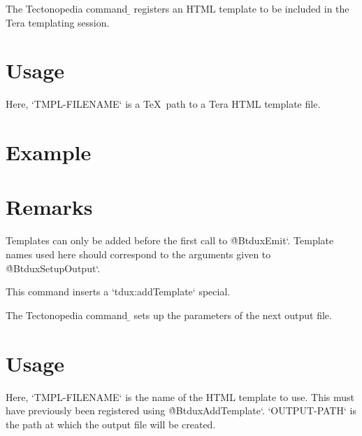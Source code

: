 
The Tectonopedia command \b{\string\tduxAddTemplate} registers an HTML template
to be included in the Tera templating session.

\section*{Usage}

\begin{texdisp}
\end{texdisp}

Here, \tex`TMPL-FILENAME` is a \TeX\ path to a Tera HTML template file.

\section*{Example}

\begin{texdisp}
\end{texdisp}

\section*{Remarks}

Templates can only be added before the first call to \`@BtduxEmit`. Template
names used here should correspond to the arguments given to
\`@BtduxSetupOutput`.

This command inserts a \tex`tdux:addTemplate` special.



The Tectonopedia command \b{\string\tduxSetupOutput} sets up the parameters of
the next output file.

\section*{Usage}

\begin{texdisp}
\end{texdisp}

Here, \tex`TMPL-FILENAME` is the name of the HTML template to use. This must
have previously been registered using \`@BtduxAddTemplate`. \tex`OUTPUT-PATH` is
the path at which the output file will be created.

